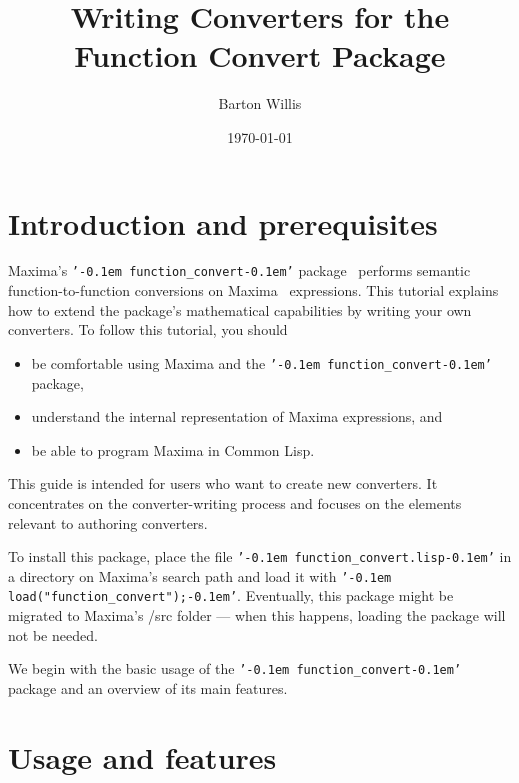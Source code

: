 \documentclass[12pt,fleqn]{extarticle}
\title{Writing Converters for the Function Convert Package}
\author{Barton Willis}
\date{\today}
\newcommand{\ttq}[1]{\texttt{'\kern-0.1em #1\kern-0.1em'}}
\newcommand{\funconvert}{\ttq{function\_convert}{ }}
\begin{document}
\maketitle
\tableofcontents


\section{Introduction and prerequisites}

Maxima’s \funconvert package~\cite{willis-function-convert} performs semantic function-to-function conversions on Maxima~\cite{maxima} expressions. This tutorial explains how to extend the package’s mathematical capabilities by writing your own converters. To follow this tutorial, you should 
\begin{itemize}
  \item be comfortable using Maxima and the \funconvert package,
  \item understand the internal representation of Maxima expressions, and
  \item be able to program Maxima in Common Lisp.
\end{itemize}

This guide is intended for users who want to create new converters. It concentrates on the converter-writing process and focuses on the elements relevant to authoring converters.

To install this package, place the file \ttq{function\_convert.lisp} in a directory on Maxima’s search path and load it with  \ttq{load("function\_convert");}.  Eventually, this package might be migrated to 
Maxima's /src folder --- when this happens, loading the package will not be needed.

We begin with the basic usage of the \funconvert package and an overview of its main features.


\section{Usage and features}
\end{document}
